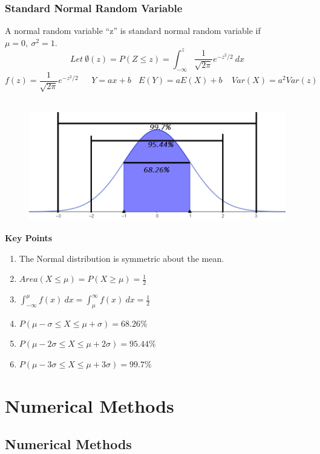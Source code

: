 \subsection{Standard Normal Random Variable}
A normal random variable ``z'' is standard normal random variable if \(\mu=0,\ \sigma^2=1.\)
\[Let\ \emptyset(z)=P(Z\leq z)=\int_{-\infty}^z\frac{1}{\sqrt{2\pi}}e^{-{z^2/2}}\ dx\]
\[f(z)=\frac{1}{\sqrt{2\pi}}e^{-{z^2/2}}\ \ \ \ \ \ \ Y=ax+b\ \ \ \ E(Y)=aE(X)+b\ \ \ \ \ Var(X)=a^2Var(z)\]\vspace{0.2cm}\\

\begin{figure}[h!]
    \centering
    \includegraphics[scale=0.75]{images/standard-random-variable.png}
\end{figure}
\textbf{Key Points}
\begin{enumerate}
    \item The Normal distribution is symmetric about the mean.
    \item \(Area(X\leq\mu)=P(X\geq\mu)= \frac{1}{2}\)
    \item \(\int_{-\infty}^{\mu}f(x)\ dx=\int_{\mu}^{\infty}f(x)\ dx = \frac{1}{2}\)
    \item \(P(\mu-\sigma\leq X\leq \mu+\sigma)=68.26\%\)
    \item \(P(\mu-2\sigma\leq X\leq \mu+2\sigma)=95.44\%\)
    \item \(P(\mu-3\sigma\leq X\leq \mu+3\sigma)=99.7\%\)
\end{enumerate}

\chapter*{Numerical Methods}
\section{Numerical Methods}

